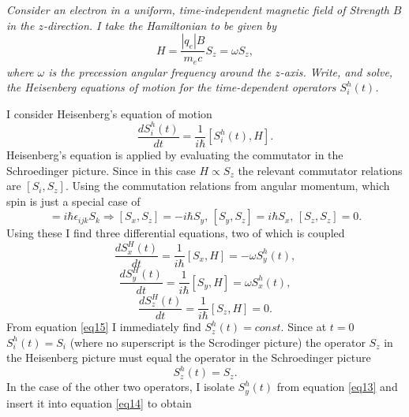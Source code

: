 \begin{example}
	\emph{Consider an electron in a uniform, time-independent magnetic field of Strength $B$ in the $z$-direction. I take the Hamiltonian to be given by}
	\begin{equation}
		H=\frac{|q_e|B}{m_ec}S_z=\omega S_z,
	\end{equation} 
	\emph{where $\omega$ is the precession angular frequency around the $z$-axis. Write, and solve, the Heisenberg equations of motion for the time-dependent operators $S_i^h(t)$.}\newline
	
	I consider Heisenberg's equation of motion
	\begin{equation}
		\frac{d S_i^h(t)}{dt}=\frac{1}{i\hbar}[S_i^h(t),H].
	\end{equation} 
	Heisenberg's equation is applied by evaluating the commutator in the Schroedinger picture. Since in this case $H\propto S_z$ the relevant commutator relations are $[S_i,S_z]$. Using the commutation relations from angular momentum, which spin is just a special case of
	\begin{equation}
		[S_i,S_j]=i\hbar\epsilon_{ijk}S_k 	\Rightarrow [S_x,S_z]=-i\hbar S_y,\, [S_y,S_z]=i\hbar S_x,\, [S_z,S_z]=0.
	\end{equation} 
	Using these I find three differential equations, two of which is coupled
	\begin{equation}
		\frac{d S_x^H(t)}{dt}=\frac{1}{i\hbar}[S_x,H]=-\omega S_y^h(t),
		\label{eq13}
	\end{equation} 
	\begin{equation}
		\frac{d S_y^H(t)}{dt}=\frac{1}{i\hbar}[S_y,H]=\omega S_x^h(t),
		\label{eq14}
	\end{equation} 
	\begin{equation}
		\frac{d S_z^H(t)}{dt}=\frac{1}{i\hbar}[S_z,H]=0.
		\label{eq15}
	\end{equation} 
	From equation \eqref{eq15} I immediately find $S_z^h(t)=const$. Since at $t=0$ $S_i^h(t)=S_i$ (where no superscript is the Scrodinger picture) the operator $S_z$ in the Heisenberg picture must equal the operator in the Schroedinger picture
	\begin{equation}
		S_z^h(t)=S_z.
	\end{equation} 
	In the case of the other two operators, I isolate $S_y^h(t)$ from equation \eqref{eq13} and insert it into equation \eqref{eq14} to obtain
	\begin{equation}

\end{equation}
\end{example}
